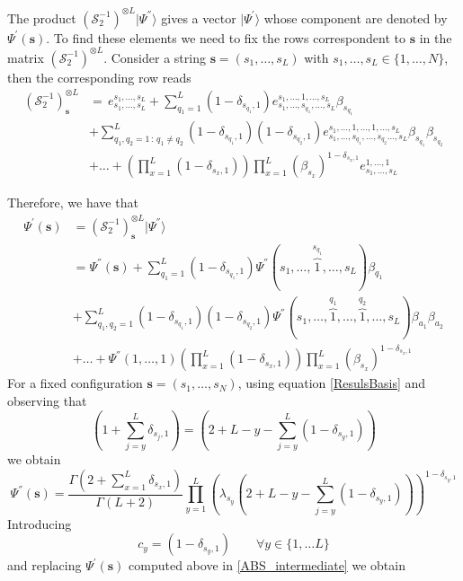 \documentclass[11pt]{article}
\numberwithin{equation}{section}
\numberwithin{equation}{subsection}
\begin{document}
The product $\left(\mathcal{S}_{2}^{-1}\right)^{\otimes L}|\Psi^{''}\rangle$ gives a vector $|\Psi^{'}\rangle$ whose component are denoted by $\Psi^{'}(\bm{s})$. 
To find these elements we need to fix the rows correspondent to $\bm{s}$ in the matrix $\left(\mathcal{S}_{2}^{-1}\right)^{\otimes L}$. Consider a string $\bm{s}=(s_{1},\ldots,s_{L})$ with $s_{1},\ldots,s_{L}\in \{1,\ldots,N\}$, then the corresponding row reads
\begin{equation}
	\begin{split}
\left(\mathcal{S}_{2}^{-1}\right)^{\otimes L}_{\bm{s}}&=\,e_{s_{1},\ldots,s_{L}}^{s_{1},\ldots,s_{L}}+\sum_{q_{1}=1}^{L}(1-\delta_{s_{q_{1}},1})e_{s_{1},\ldots,s_{q_{1}},\ldots,s_{L}}^{s_{1},\ldots,1,\ldots,s_{L}}\beta_{s_{q_{1}}}\\&+\sum_{q_{1},q_{2}=1\,:\,q_{1}\neq q_{2}}^{L}(1-\delta_{s_{q_{1}},1})(1-\delta_{s_{q_{2}},1})e_{s_{1},\ldots,s_{q_{1}},\ldots,s_{q_{2}}\ldots,s_{L}}^{s_{1},\ldots,1,\ldots,1,\ldots,s_{L}}\beta_{s_{q_{1}}}\beta_{s_{q_{2}}}
  \\&+
  \ldots+\left(\prod_{x=1}^{L}(1-\delta_{s_{x},1})\right)\prod_{x=1}^{L}\left(\beta_{s_{x}}\right)^{1-\delta_{s_{x},1}}e_{s_{1},\ldots,s_{L}}^{1,\ldots,1}
	\end{split}
\end{equation}

Therefore, we have that 
\begin{equation}\label{ABS_intermediate}
	\begin{split}
		\Psi^{'}(\mathbf{s})&=(\mathcal{S}_{2}^{-1})_{\bm{s}}^{\otimes L}|\Psi^{''}\rangle\\&= \Psi^{''}(\mathbf{s})+\sum_{q_{1}= 1}^{L}(1-\delta_{s_{q_{1}},1})\Psi^{''}(s_{1},\ldots,\overbrace{1}^{s_{q_{1}}},\ldots,s_{L})\beta_{q_{1}}\\&+
		\sum_{q_{1},q_{2}= 1}^{L}(1-\delta_{s_{q_{1}},1})(1-\delta_{s_{q_{2}},1})\Psi^{''}(s_{1},\ldots,\overbrace{1}^{q_{1}},\ldots,\overbrace{1}^{q_{2}},\ldots,s_{L})\beta_{a_{1}}\beta_{a_{2}}\\&+\ldots+\Psi^{''}(1,\ldots,1)\left(\prod_{x=1}^{L}(1-\delta_{s_{x},1})\right)\prod_{x=1}^{L}\left(\beta_{s_{x}}\right)^{1-\delta_{s_{x},1}}
	\end{split}
\end{equation}
For a fixed configuration $\bm{s}=(s_{1},\ldots,s_{N})$, using equation \eqref{ResulsBasis} and observing that 
\begin{equation}
  \left(1+\sum_{j=y}^{L}\delta_{s_{j},1}\right) =\left(2+L-y-\sum_{j=y}^{L}(1-\delta_{s_{y},1})\right)
\end{equation}
we obtain 
    \begin{equation}
\Psi^{''}(\bm{s})=\frac{\Gamma(2+\sum_{x=1}^{L}\delta_{s_{x},1})}{\Gamma(L+2)}\prod_{y=1}^{L}\left(\lambda_{s_{y}}\left(2+L-y-\sum_{j=y}^{L}(1-\delta_{s_{y},1})\right)\right)^{1-\delta_{s_{y},1}}
\end{equation}
Introducing
\begin{equation}
	c_{y}=(1-\delta_{s_{y},1}) \qquad \forall y\in \{1,\ldots L\}
\end{equation}
and replacing $\Psi^{'}(\bm{s})$ computed above in \eqref{ABS_intermediate} we obtain 
\end{document}
